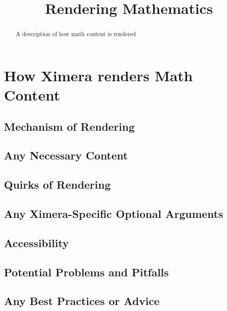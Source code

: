 \documentclass{ximera}
\title{Rendering Mathematics}
\begin{document}
\begin{abstract}
    A description of how math content is rendered
\end{abstract}
\maketitle
   
\section*{How Ximera renders Math Content}
    \subsection*{Mechanism of Rendering}
    
    
    
    \subsection*{Any Necessary Content}
    
    
    
    \subsection*{Quirks of Rendering}
    
    
    
    \subsection*{Any Ximera-Specific Optional Arguments}
    
    
    
    \subsection*{Accessibility}
    
    
    
    \subsection*{Potential Problems and Pitfalls}
    
    
    
    \subsection*{Any Best Practices or Advice}
    
    
    
\end{document}
